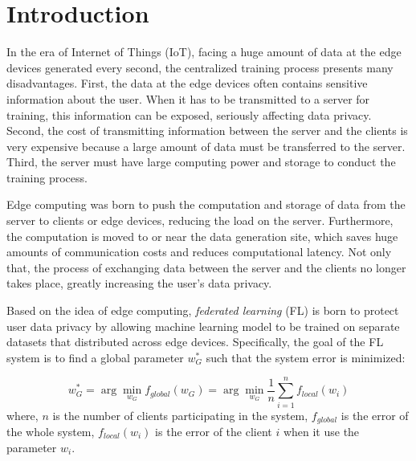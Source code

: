 \documentclass[runningheads]{llncs}
\begin{document}
\section{Introduction}

In the era of Internet of Things (IoT), facing a huge amount of data at the edge devices generated every second, the centralized training process presents many disadvantages. First, the data at the edge devices often contains sensitive information about the user. When it has to be transmitted to a server for training, this information can be exposed, seriously affecting data privacy. Second, the cost of transmitting information between the server and the clients is very expensive because a large amount of data must be transferred to the server. Third, the server must have large computing power and storage to conduct the training process.

Edge computing \cite{khan2019edge} was born to push the computation and storage of data from the server to clients or edge devices, reducing the load on the server. Furthermore, the computation is moved to or near the data generation site, which saves huge amounts of communication costs and reduces computational latency. Not only that, the process of exchanging data between the server and the clients no longer takes place, greatly increasing the user's data privacy.

Based on the idea of edge computing, \textit{federated learning} (FL) \cite{mcmahan2017communication} is born to protect user data privacy by allowing machine learning model to be trained on separate datasets that distributed across edge devices. Specifically, the goal of the FL system is to find a global parameter $w_G^*$ such that the system error is minimized:

\begin{dmath}
    w_G^* = \arg\min_{w_G}{f_{global}(w_G)}
        = \arg\min_{w_G}{\frac{1}{n} \sum_{i=1}^n{f_{local}(w_i)}}
\end{dmath} where, $n$ is the number of clients participating in the system, $f_{global}$ is the error of the whole system, $f_{local}(w_i)$ is the error of the client $i$ when it use the parameter $w_i$.
\end{document}
